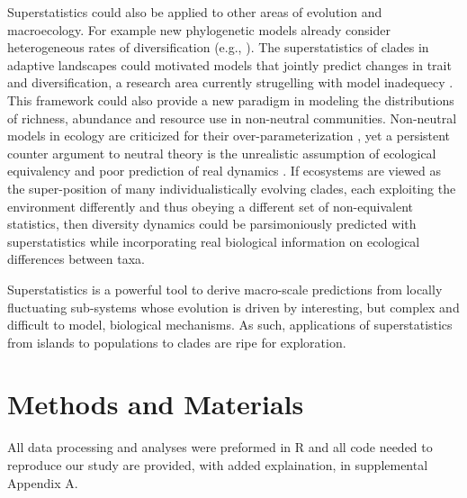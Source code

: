 \documentclass[12pt]{article}
\let\citep=\cite
\begin{document}
Superstatistics could also be applied to other areas of evolution and
macroecology.  For example new phylogenetic models already consider
heterogeneous rates of diversification (e.g.,
\citep{rabosky2014}). The superstatistics of clades in adaptive
landscapes could motivated models that jointly predict changes in
trait and diversification, a research area currently strugelling with
model inadequecy \citep{rabosky2017fisse}. This framework could also
provide a new paradigm in modeling the distributions of richness,
abundance and resource use in non-neutral communities. Non-neutral
models in ecology are criticized for their over-parameterization
\citep{rosindell2011}, yet a persistent counter argument to neutral
theory \citep{hubbell2001} is the unrealistic assumption of ecological
equivalency \citep{chave2004neutral} and poor prediction of real
dynamics \citep{ricklefs2006neutral}. If ecosystems are viewed as the
super-position of many individualistically evolving clades, each
exploiting the environment differently and thus obeying a different
set of non-equivalent statistics, then diversity dynamics could be
parsimoniously predicted with superstatistics while incorporating real
biological information on ecological differences between taxa.

Superstatistics is a powerful tool to derive macro-scale predictions
from locally fluctuating sub-systems whose evolution is driven by
interesting, but complex and difficult to model, biological
mechanisms. As such, applications of superstatistics from islands to
populations to clades are ripe for exploration.


\section{Methods and Materials}

All data processing and analyses were preformed in R \citep{rcite} and
all code needed to reproduce our study are provided, with added
explaination, in supplemental Appendix A.
\end{document}
